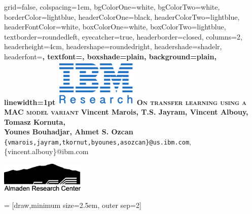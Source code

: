 \documentclass[final,paperwidth=36in,paperheight=48in,portrait,fontscale=0.36]{baposter}
\begin{document}
\begin{poster}%
  {
  grid=false,
  colspacing=1em,
  bgColorOne=white,
  bgColorTwo=white,
  borderColor=lightblue,
  headerColorOne=black,
  headerColorTwo=lightblue,
  headerFontColor=white,
  boxColorOne=white,
  boxColorTwo=lightblue,
  textborder=roundedleft,
  eyecatcher=true,
  headerborder=closed,
  columns=2,
  headerheight=4cm,
  headershape=roundedright,
  headershade=shadelr,
  headerfont=\Large\bf\textsc, %
  textfont={\setlength{\parindent}{1.5em}\large},
  boxshade=plain,
  background=plain,
  linewidth=1pt
  } 
  { %
\includegraphics[width=4cm]{../img/ibm_research.png}
  } 
  	{\bf\textsc{On transfer learning using a MAC model variant}\vspace{0.2em}}
  {
	\textbf{Vincent Marois, T.S. Jayram, Vincent Albouy, Tomasz Kornuta, \\Younes Bouhadjar, Ahmet S. Ozcan}\\

	\texttt{\{vmarois,jayram,tkornut,byounes,asozcan\}@us.ibm.com},{\{vincent.albouy\}@ibm.com}\\
  }
  { %
  
\includegraphics[width=4cm]{../img/arc_logo.png}



  }


\newcommand{\colouredcircle}{%
\tikz{\useasboundingbox (-0.2em,-0.32em) rectangle(0.2em,0.32em); \draw[draw=black,fill=lightblue,line width=0.03em] (0,0) circle(0.16em);}}
 = [draw,minimum size=2.5em, outer sep=2]



\end{poster}
\end{document}
